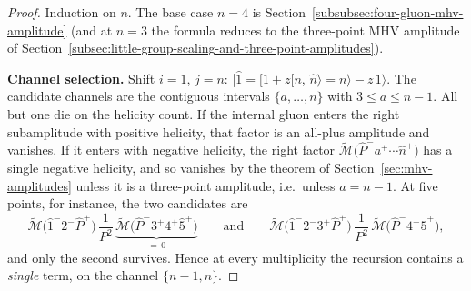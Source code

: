 \begin{proof}
	Induction on $n$. The base case $n = 4$ is Section~\ref{subsubsec:four-gluon-mhv-amplitude} (and at $n = 3$ the formula reduces to the three-point MHV amplitude of Section~\ref{subsec:little-group-scaling-and-three-point-amplitudes}).

	\textbf{Channel selection.} Shift $i = 1$, $j = n$: $[\hat 1 = [1 + z[n$, $\hat n \rangle = n\rangle - z\, 1\rangle$. The candidate channels are the contiguous intervals $\{a, \ldots, n\}$ with $3 \le a \le n-1$. All but one die on the helicity count. If the internal gluon enters the right subamplitude with positive helicity, that factor is an all-plus amplitude and vanishes. If it enters with negative helicity, the right factor $\widetilde{\mathcal{M}}\big(\hat P^- a^+ \cdots \hat n^+\big)$ has a single negative helicity, and so vanishes by the theorem of Section~\ref{sec:mhv-amplitudes} unless it is a three-point amplitude, i.e.\ unless $a = n - 1$. At five points, for instance, the two candidates are
	\[
		\widetilde{\mathcal{M}}\big(\hat 1^- 2^- \hat P^+\big)\, \frac{1}{P^2}\, \underbrace{\widetilde{\mathcal{M}}\big(\hat P^- 3^+ 4^+ \hat 5^+\big)}_{=\,0} \qquad \text{and} \qquad
		\widetilde{\mathcal{M}}\big(\hat 1^- 2^- 3^+ \hat P^+\big)\, \frac{1}{P^2}\, \widetilde{\mathcal{M}}\big(\hat P^- 4^+ \hat 5^+\big)
	,\]
	and only the second survives. Hence at every multiplicity the recursion contains a \emph{single} term, on the channel $\{n{-}1, n\}$.


\end{proof}
